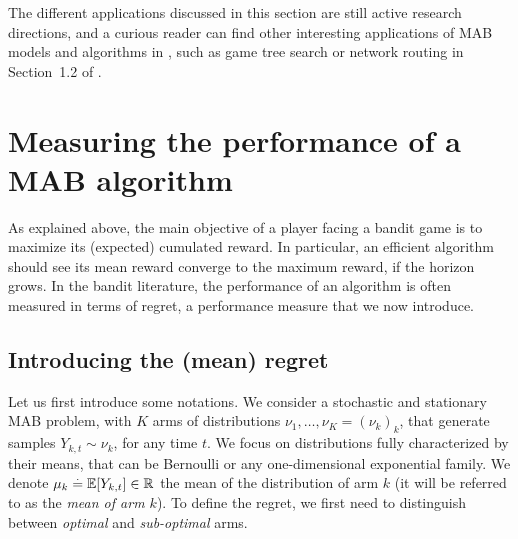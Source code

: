 The different applications discussed in this section are still active research directions,
and a curious reader can find other interesting applications of MAB models and algorithms in \cite{bouneffouf2019survey}, such as game tree search or network routing in Section~1.2 of \cite{LattimoreBanditAlgorithmsBook}.


\section{Measuring the performance of a MAB algorithm}
\label{sec:2:lowerUpperBoundsRegret}

As explained above, the main objective of a player facing a bandit game is to maximize its (expected) cumulated reward.
%
In particular, an efficient algorithm should see its mean reward converge to the maximum reward, if the horizon grows.
In the bandit literature, the performance of an algorithm is often measured in terms of regret, a performance measure that we now introduce.


\subsection{Introducing the (mean) regret}

Let us first introduce some notations.
We consider a stochastic and stationary MAB problem, with $K$ arms of distributions $\nu_1,\dots,\nu_K=(\nu_k)_k$, that generate \iid{} samples $Y_{k,t} \sim \nu_k$, for any time $t$.
We focus on distributions fully characterized by their means, that can be Bernoulli or any one-dimensional exponential family.
We denote $\mu_k \overset{.}{=} \mathbb{E}[Y_{k,t}] \in \mathbb{R}$ the mean of the distribution of arm $k$ (it will be referred to as the \emph{mean of arm $k$}).
%
%
To define the regret, we first need to distinguish between \emph{optimal} and \emph{sub-optimal} arms.


